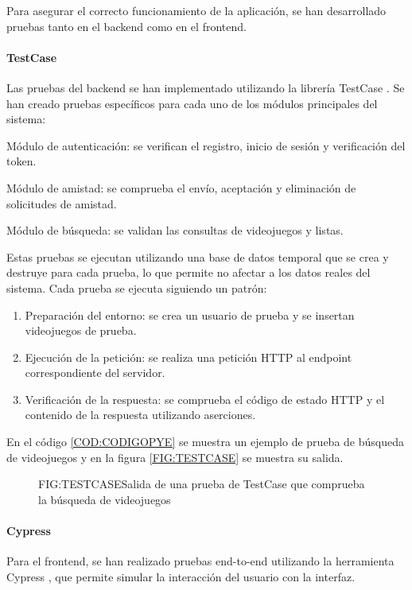 Para asegurar el correcto funcionamiento de la aplicación, se han desarrollado pruebas tanto en el backend como en el frontend.

\paragraph{TestCase}
Las pruebas del backend se han implementado utilizando la librería TestCase \cite{djangotesting2025}. Se han creado pruebas específicos para cada uno de los módulos principales del sistema:

\begin{description}
    \item Módulo de autenticación: se verifican el registro, inicio de sesión y verificación del token.
    \item Módulo de amistad: se comprueba el envío, aceptación y eliminación de solicitudes de amistad.
    \item Módulo de búsqueda: se validan las consultas de videojuegos y listas.
\end{description}

Estas pruebas se ejecutan utilizando una base de datos temporal que se crea y destruye para cada prueba, lo que permite no afectar a los datos reales del sistema. 
Cada prueba se ejecuta siguiendo un patrón:
\begin{enumerate}
    \item Preparación del entorno: se crea un usuario de prueba y se insertan videojuegos de prueba.
    \item Ejecución de la petición: se realiza una petición HTTP al endpoint correspondiente del servidor.
    \item Verificación de la respuesta: se comprueba el código de estado HTTP y el contenido de la respuesta utilizando aserciones.
\end{enumerate} 

En el código \ref{COD:CODIGOPYE} se muestra un ejemplo de prueba de búsqueda de videojuegos y en la figura \ref{FIG:TESTCASE} se muestra su salida.

\begin{figure}[Salida TestCase]{FIG:TESTCASE}{Salida de una prueba de TestCase que comprueba la búsqueda de videojuegos}
\end{figure}

\paragraph{Cypress}
Para el frontend, se han realizado pruebas end-to-end utilizando la herramienta Cypress \cite{cypresstest2025}, que permite simular la interacción del usuario con la interfaz.

